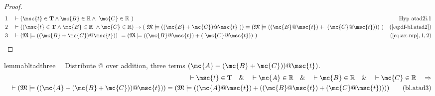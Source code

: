 \begin{proof}
\begin{align}
  1 &&  & \vdash ( \msc{t} \in \mathbf{T} \wedge \mc{B} \in \mathbb{R} \wedge
     ~\mc{C} \in \mathbb{R}
     ~)&\text{Hyp~atad2i.1}\notag%
  \\ 2 &&  & \vdash ( ( \msc{t} \in \mathbf{T} \wedge \mc{B} \in \mathbb{R}
     ~\wedge \mc{C} \in \mathbb{R} ) \rightarrow (
     ~\mathfrak{M} \models ( ( \mc{B} + \mc{C} ) @ \msc{t}
     ~) ) = ( \mathfrak{M} \models ( ( \mc{B} @ \msc{t} ) +
     ~( \mc{C} @ \msc{t} ) ) )
     ~)&(\mbox{\ref{eq:df-bl.atad2}})\notag
  \\ 3 &&  & \vdash ( \mathfrak{M} \models ( ( \mc{B} + \mc{C} ) @ \msc{t} ) )
     ~= ( \mathfrak{M} \models ( ( \mc{B} @ \msc{t} ) + (
     ~\mc{C} @ \msc{t} ) )
     ~)&(\mbox{\ref{eq:ax-mp}},1,2)\notag
\end{align}
\end{proof}

\begin{restatable}{lemma}{bltadthree}~~ Distribute @ over addition, three terms $(
\mc{A} + ( \mc{B} + \mc{C} ) ) @ \msc{t} )$.
\begin{align}
\vdash \msc{t} \in \mathbf{T}\quad\&\quad \vdash \mc{A} \in
    \mathbb{R}\quad\&\quad \vdash \mc{B} \in \mathbb{R}\quad\&\quad \vdash
    \mc{C} \in \mathbb{R}\quad\Rightarrow \notag \\ 
	\quad \vdash ( \mathfrak{M} \models (
    ( \mc{A} + ( \mc{B} + \mc{C} ) ) @ \msc{t} ) ) = ( \mathfrak{M} \models ( (
    \mc{A} @ \msc{t} ) + ( ( \mc{B} @ \msc{t} ) + ( \mc{C} @ \msc{t} ) ) )
    )\label{eq:bl.atad3}\tag{bl.atad3}
\end{align}
\end{restatable}

